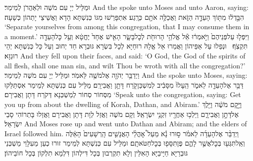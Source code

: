 {וּמַלֵּיל יְיָ עִם מֹשֶׁה וּלְאַהֲרֹן לְמֵימַר׃}
{And the \lord\space spoke unto Moses and unto Aaron, saying:}{}
{הִבָּ֣דְל֔וּ מִתּ֖וֹךְ הָעֵדָ֣ה הַזֹּ֑את וַאֲכַלֶּ֥ה אֹתָ֖ם כְּרָֽגַע׃}
{אִתְפָּרַשׁוּ מִגּוֹ כְּנִשְׁתָּא הָדָא וַאֲשֵׁיצֵי יָתְהוֹן כְּשָׁעָה׃}
{‘Separate yourselves from among this congregation, that I may consume them in a moment.’}{}
{וַיִּפְּל֤וּ עַל\maqqaf פְּנֵיהֶם֙ וַיֹּ֣אמְר֔וּ אֵ֕ל אֱלֹהֵ֥י הָרוּחֹ֖ת לְכׇל\maqqaf בָּשָׂ֑ר הָאִ֤ישׁ אֶחָד֙ יֶחֱטָ֔א וְעַ֥ל כׇּל\maqqaf הָעֵדָ֖ה תִּקְצֹֽף׃ \setuma }
{וּנְפַלוּ עַל אַפֵּיהוֹן וַאֲמַרוּ אֵל אֱלָהּ רוּחַיָּא לְכָל בִּשְׂרָא גּוּבְרָא חַד יְחוּב וְעַל כָּל כְּנִשְׁתָּא יְהֵי רוּגְזָא׃}
{And they fell upon their faces, and said: ‘O God, the God of the spirits of all flesh, shall one man sin, and wilt Thou be wroth with all the congregation?’}{}
{וַיְדַבֵּ֥ר יְהֹוָ֖ה אֶל\maqqaf מֹשֶׁ֥ה לֵּאמֹֽר׃}
{וּמַלֵּיל יְיָ עִם מֹשֶׁה לְמֵימַר׃}
{And the \lord\space spoke unto Moses, saying:}{}
{דַּבֵּ֥ר אֶל\maqqaf הָעֵדָ֖ה לֵאמֹ֑ר הֵֽעָלוּ֙ מִסָּבִ֔יב לְמִשְׁכַּן\maqqaf קֹ֖רַח דָּתָ֥ן וַאֲבִירָֽם׃}
{מַלֵּיל עִם כְּנִשְׁתָּא לְמֵימַר אִסְתַּלַּקוּ מִסְּחוֹר סְחוֹר לְמַשְׁכְּנָא דְּקֹרַח דָּתָן וַאֲבִירָם׃}
{‘Speak unto the congregation, saying: Get you up from about the dwelling of Korah, Dathan, and Abiram.’}{}
{וַיָּ֣קׇם מֹשֶׁ֔ה וַיֵּ֖לֶךְ אֶל\maqqaf דָּתָ֣ן וַאֲבִירָ֑ם וַיֵּלְכ֥וּ אַחֲרָ֖יו זִקְנֵ֥י יִשְׂרָאֵֽל׃}
{וְקָם מֹשֶׁה וַאֲזַל לְוָת דָּתָן וַאֲבִירָם וַאֲזַלוּ בָּתְרוֹהִי סָבֵי יִשְׂרָאֵל׃}
{And Moses rose up and went unto Dathan and Abiram; and the elders of Israel followed him.}{}
{וַיְדַבֵּ֨ר אֶל\maqqaf הָעֵדָ֜ה לֵאמֹ֗ר ס֣וּרוּ נָ֡א מֵעַל֩ אׇהֳלֵ֨י הָאֲנָשִׁ֤ים הָֽרְשָׁעִים֙ הָאֵ֔לֶּה וְאַֽל\maqqaf תִּגְּע֖וּ בְּכׇל\maqqaf אֲשֶׁ֣ר לָהֶ֑ם פֶּן\maqqaf תִּסָּפ֖וּ בְּכׇל\maqqaf חַטֹּאתָֽם׃}
{וּמַלֵּיל עִם כְּנִשְׁתָּא לְמֵימַר זוּרוּ כְעַן מֵעִלָּוֵי מַשְׁכְּנֵי גּוּבְרַיָּא חַיָּיבַיָּא הָאִלֵּין וְלָא תִקְרְבוּן בְּכָל דִּילְהוֹן דִּלְמָא תִלְקוֹן בְּכָל חוֹבֵיהוֹן׃}
